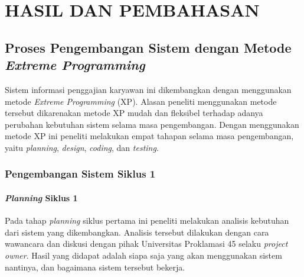 
\chapter{HASIL DAN PEMBAHASAN}
	\section{Proses Pengembangan Sistem dengan Metode \emph{Extreme Programming}}
	Sistem informasi penggajian karyawan ini dikembangkan dengan menggunakan metode \emph{Extreme Programming} (XP). Alasan peneliti menggunakan metode tersebut dikarenakan metode XP mudah dan fleksibel terhadap adanya perubahan kebutuhan sistem selama masa pengembangan. Dengan menggunakan metode XP ini peneliti melakukan empat tahapan selama masa pengembangan, yaitu \emph{planning}, \emph{design}, \emph{coding}, dan \emph{testing}.
	
	\subsection{Pengembangan Sistem Siklus 1}
	
	\subsubsection{\emph{Planning} Siklus 1}
	Pada tahap \emph{planning} siklus pertama ini peneliti melakukan analisis kebutuhan dari sistem yang dikembangkan. Analisis tersebut dilakukan dengan cara wawancara dan diskusi dengan pihak Universitas Proklamasi 45 selaku \emph{project owner}. Hasil yang didapat adalah siapa saja yang akan menggunakan sistem nantinya, dan bagaimana sistem tersebut bekerja.
	
